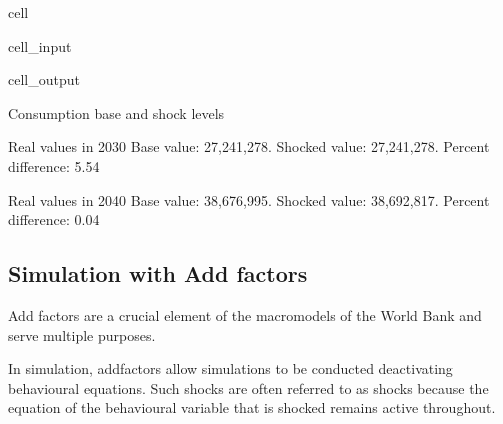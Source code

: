 \documentclass[letterpaper,10pt,english]{jupyterBook}
\begin{document}
\begin{sphinxuseclass}{cell}
\begin{sphinxVerbatimInput}
\begin{sphinxuseclass}{cell_input}
\begin{sphinxVerbatim}[commandchars=\\\{\}]
    \PYG{p}{[}\PYG{p}{]}\PYG{p}{[}\PYG{p}{]}\PYG{p}{[}\PYG{p}{]}
\end{sphinxVerbatim}

\end{sphinxuseclass}\end{sphinxVerbatimInput}
\begin{sphinxVerbatimOutput}

\begin{sphinxuseclass}{cell_output}
\begin{sphinxVerbatim}[commandchars=\\\{\}]
Consumption base and shock levels

Real values in 2030
Base value:  27,241,278.	Shocked value: 27,241,278.
Percent difference: 5.54

Real values in 2040
Base value:  38,676,995.	Shocked value: 38,692,817.
Percent difference: 0.04
\end{sphinxVerbatim}

\end{sphinxuseclass}\end{sphinxVerbatimOutput}

\end{sphinxuseclass}

\subsection{Simulation with Add factors}
\label{\detokenize{content/05_WBModels/ScenarioAnalysis:simulation-with-add-factors}}
\sphinxAtStartPar
Add factors are a crucial element of the macromodels of the World Bank and serve multiple purposes.

\sphinxAtStartPar
In simulation, add\sphinxhyphen{}factors allow simulations to be conducted  de\sphinxhyphen{}activating behavioural equations.  Such shocks are often referred to as  shocks because the equation of the behavioural variable that is shocked remains  active throughout.
\end{document}
